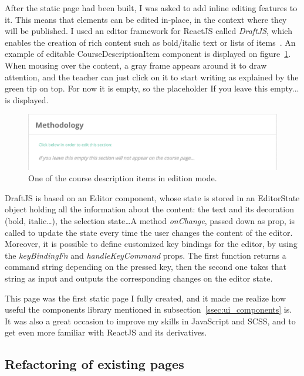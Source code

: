After the static page had been built, I was asked to add inline editing features to it.
This means that elements can be edited in-place, in the context where they will be published. I used an editor framework for ReactJS called \textit{DraftJS}, which enables the creation of rich content such as bold/italic text or lists of items~\cite{draftJS}. An example of editable CourseDescriptionItem component is displayed on {\sc figure}~\ref{fig:courseEdit}. When mousing over the content, a gray frame appears around it to draw attention, and the teacher can just click on it to start writing as explained by the green tip on top. For now it is empty, so the placeholder \guillemotleft{} If you leave this empty... \guillemotright{} is displayed.

\begin{figure}[H]
    \centering
    \includegraphics[scale=0.4]{figure/courseEdit.png}
    \caption{One of the course description items in edition mode.}
    \label{fig:courseEdit}
\end{figure}

DraftJS is based on an \guillemotleft{} Editor \guillemotright{} component, whose state is stored in an \guillemotleft{} EditorState \guillemotright{} object holding all the information about the content: the text and its decoration (bold, italic\ldots), the selection state\ldots A method \textit{onChange}, passed down as prop, is called to update the state every time the user changes the content of the editor. Moreover, it is possible to define customized key bindings for the editor, by using the \textit{keyBindingFn} and \textit{handleKeyCommand} props. The first function returns a command string depending on the pressed key, then the second one takes that string as input and outputs the corresponding changes on the editor state.

This page was the first static page I fully created, and it made me realize how useful the components library mentioned in {\sc subsection}~\ref{ssec:ui_components} is. It was also a great occasion to improve my skills in JavaScript and SCSS, and to get even more familiar with ReactJS and its derivatives.

\subsection{Refactoring of existing pages}
\label{ssec:refactor}

